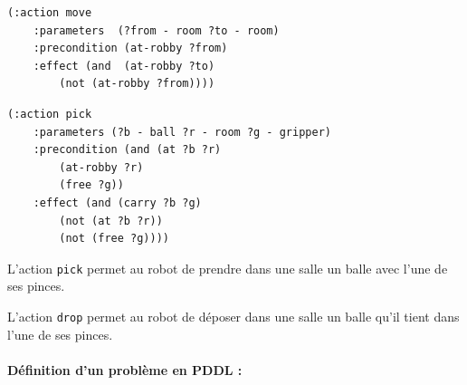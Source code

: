 \begin{lstlisting}[language=pddl,frame=single]
(:action move
    :parameters  (?from - room ?to - room)
    :precondition (at-robby ?from)
    :effect (and  (at-robby ?to)
        (not (at-robby ?from))))
\end{lstlisting}

\begin{lstlisting}[language=pddl,frame=single]
(:action pick
    :parameters (?b - ball ?r - room ?g - gripper)
    :precondition (and (at ?b ?r)
        (at-robby ?r)
        (free ?g))
    :effect (and (carry ?b ?g)
        (not (at ?b ?r))
        (not (free ?g))))
\end{lstlisting}

L'action \texttt{pick} permet au robot de prendre dans une salle un balle avec l'une de ses pinces.

\begin{center}
\end{center}

L'action \texttt{drop} permet au robot de déposer dans une salle un balle qu'il tient dans l'une de ses pinces.


\paragraph{Définition d'un problème en PDDL :}~\\


